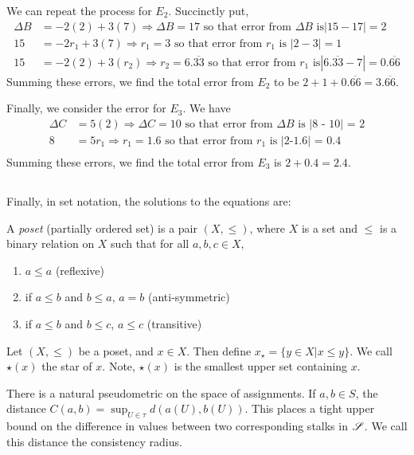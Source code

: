 \documentclass{article}
\begin{document}
We can repeat the process for $E_2$. Succinctly put,
\begin{align*}
\Delta B &= -2(2) + 3(7) \Rightarrow \Delta B = 17 \text{ so that error from $\Delta B$ is} |15 - 17| = 2 \\
15 &= -2r_1 + 3(7)  \Rightarrow r_1 = 3  \text{ so that error from $r_1$ is }|2-3| = 1  \\
15 &= -2(2) + 3(r_2) \Rightarrow r_2 = 6.\overline{33} \text{ so that error from $r_1$ is} |6.\overline{33} - 7| = 0.\overline{66}
\end{align*}
Summing these errors, we find the total error from $E_2$ to be $2 + 1 + 0.\overline{66} = 3.\overline{66}$.

Finally, we consider the error for $E_3$. We have
\begin{align*}
\Delta C &= 5(2) \Rightarrow \Delta C = 10 \text{ so that error from $\Delta B$ is |8 - 10| = 2} \\
8 &= 5r_1  \Rightarrow r_1 = 1.6  \text{ so that error from $r_1$ is |2-1.6| = 0.4}  \\
\end{align*}
Summing these errors, we find the total error from $E_3$ is $2 + 0.4 = 2.4$.

\subsection{}
Finally, in set notation, the solutions to the equations are:

 A \emph{poset} (partially ordered set) is a pair 
$(X,\leq)$, where $X$ is a set and $\leq$ is a binary relation on $X$ such that 
for all $a,b,c \in X$, 
\begin{enumerate}
	\item $a \leq a$ (reflexive)
	\item if $a \leq b$ and $b \leq a$, $a=b$ (anti-symmetric)
	\item if $a \leq b$ and $b \leq c$, $a \leq c$ (transitive)
\end{enumerate}
 Let $(X,\leq)$ be a poset, and $x \in X$. Then
define $x_\star = \{y \in X|x \leq y\}.$ We call $\star(x)$ the star of $x$.
Note, $\star(x)$ is the smallest upper set containing $x$.



 There is a natural pseudometric on
the space of assignments. If $a,b \in S$, the distance $C(a,b) = \sup_{U\in\tau}
d(a(U),b(U))$. This places a tight upper bound on the difference in values
between two corresponding stalks in $\mathscr{S}$. We call this distance the
consistency radius.
\end{document}
